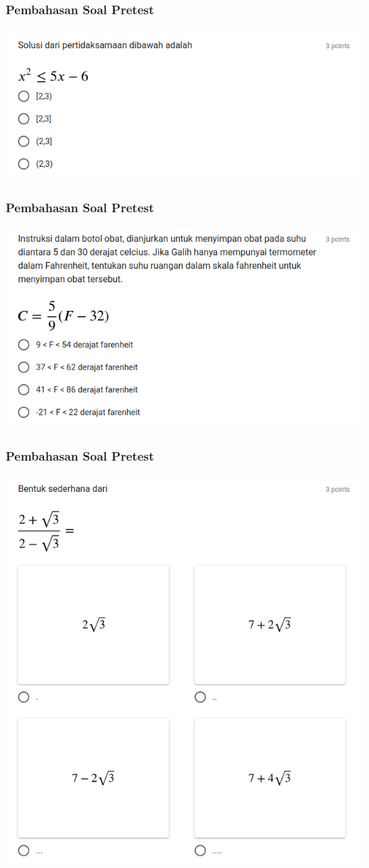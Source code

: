 \documentclass[pdflatex,compress,mathserif]{beamer}
\begin{document}
	\begin{frame}
		\frametitle{Pembahasan Soal Pretest}
		\begin{center}
			\includegraphics[width=\linewidth]{img/img04}
		\end{center}
	\end{frame}
	
	\begin{frame}
		\frametitle{Pembahasan Soal Pretest}
		\begin{center}
			\includegraphics[width=\linewidth]{img/img05}
		\end{center}
	\end{frame}
	
	\begin{frame}
		\frametitle{Pembahasan Soal Pretest}
		\begin{center}
			\includegraphics[width=0.6\linewidth]{img/img06}
		\end{center}
	\end{frame}
	
\end{document}
